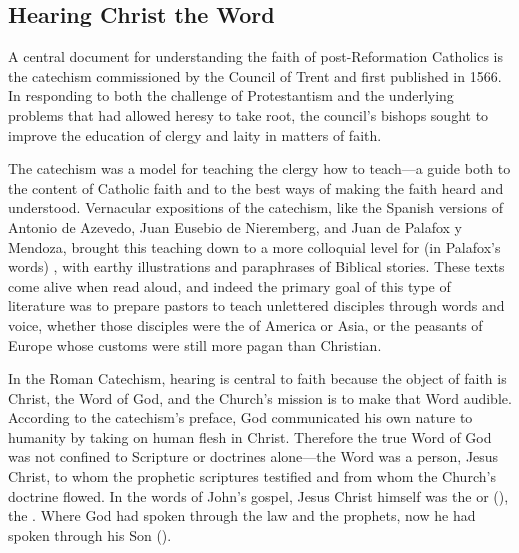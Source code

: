 \subsection{Hearing Christ the Word}

A central document for understanding the faith of post-Reformation Catholics is the catechism  commissioned by the Council of Trent and first published in 1566.%
    \Autocites{Catholic:Catechismus1614}[]{NewCatholic}
In responding to both the challenge of Protestantism and the underlying problems that had allowed heresy to take root, the council's bishops sought to improve the education of clergy and laity in matters of faith.%
\citXXX[Trent]

The catechism was a model for teaching the clergy how to teach---a guide both to the content of Catholic faith and to the best ways of making the faith heard and understood.
Vernacular expositions of the catechism, like the Spanish versions of Antonio de Azevedo, Juan Eusebio de Nieremberg, and Juan de Palafox y Mendoza, brought this teaching down to a more colloquial level for (in Palafox's words) , with earthy illustrations and paraphrases of Biblical stories.%
    \Autocites{Azevedo:Catecismo}{Nieremberg:PracticaCatecismo}{Palafox:Bocados}
These texts come alive when read aloud, and indeed the primary goal of this type of literature was to prepare pastors to teach unlettered disciples through words and voice, whether those disciples were the  of America or Asia, or the peasants of Europe whose customs were still more pagan than Christian.%

In the Roman Catechism, hearing is central to faith because the object of faith is Christ, the Word of God, and the Church's mission is to make that Word audible.
According to the catechism's preface, God communicated his own nature to humanity by taking on human flesh in Christ.
Therefore the true Word of God was not confined to Scripture or doctrines alone---the Word was a person, Jesus Christ, to whom the prophetic scriptures testified and from whom the Church's doctrine flowed.%
    \Autocite
    [9: .]
    {Catholic:Catechismus1614}
In the words of John's gospel, Jesus Christ himself was the  or  (), the .
Where God had spoken through the law and the prophets, now he had spoken through his Son ().


